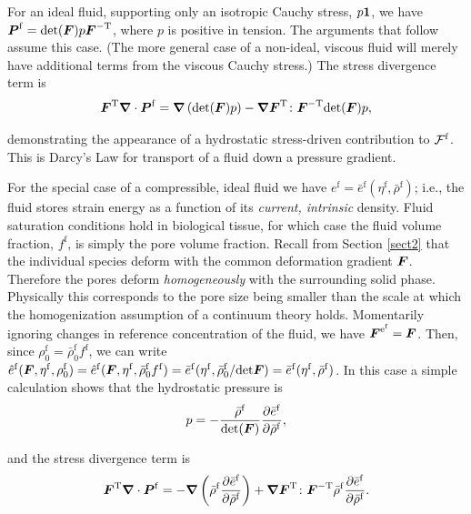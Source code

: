 \noindent For an ideal fluid, supporting only an isotropic Cauchy
stress, $p{\bf 1}$, we have $\mbox{\boldmath$ P$}^\mathrm{f} =
\mathrm{det}(\mbox{\boldmath$ F$})p\mbox{\boldmath$ F$}^{-\mathrm{T}}$, where $p$ is positive in
tension. The arguments that follow assume this case. (The more
general case of a non-ideal, viscous fluid will merely have
additional terms from the viscous Cauchy stress.) The stress
divergence term is
\begin{equation}
\mbox{\boldmath$ F$}^\mathrm{T}\mbox{\boldmath$\nabla$}\cdot\mbox{\boldmath$ P$}^\mathrm{f} =
\mbox{\boldmath$\nabla$}\left(\mathrm{det}(\mbox{\boldmath$ F$})p\right) -
\mbox{\boldmath$\nabla$}\mbox{\boldmath$ F$}^\mathrm{T}\colon\mbox{\boldmath$ F$}^{-\mathrm{T}}\mathrm{det}(\mbox{\boldmath$ F$})p,
\end{equation}

\noindent demonstrating the appearance of a hydrostatic
stress-driven contribution to ${\boldmath{{\mathcal F}}}^\mathrm{f}$. This
is Darcy's Law for transport of a fluid down a pressure gradient.

For the special case of a compressible, ideal fluid we have
$e^\mathrm{f} =
\bar{e}^\mathrm{f}(\eta^\mathrm{f},\bar{\rho}^\mathrm{f})$; i.e.,
the fluid stores strain energy as a function of its \emph{current,
intrinsic} density. Fluid saturation conditions hold in biological
tissue, for which case the fluid volume fraction, $f^\mathrm{f}$,
is simply the pore volume fraction. Recall from Section
\ref{sect2} that the individual species deform with the common
deformation gradient $\mbox{\boldmath$ F$}$. Therefore the pores deform
\emph{homogeneously} with the surrounding solid phase. Physically
this corresponds to the pore size being smaller than the scale at
which the homogenization assumption of a continuum theory holds.
Momentarily ignoring changes in reference concentration of the
fluid, we have $\mbox{\boldmath$ F$}^{\mathrm{e}^\mathrm{f}} = \mbox{\boldmath$ F$}$.  Then, since
$\rho^\mathrm{f}_0 = \bar{\rho}^\mathrm{f}_0 f^\mathrm{f}$, we can
write $\hat{e}^\mathrm{f}(\mbox{\boldmath$ F$},\eta^\mathrm{f},\rho^\mathrm{f}_0) =
\hat{e}^\mathrm{f}(\mbox{\boldmath$ F$},\eta^\mathrm{f},\bar{\rho}^\mathrm{f}_0
f^\mathrm{f}) =
\bar{e}^\mathrm{f}(\eta^\mathrm{f},\bar{\rho}^\mathrm{f}_0/\mathrm{det}\mbox{\boldmath$ F$})=
\bar{e}^\mathrm{f}(\eta^\mathrm{f},\bar{\rho}^\mathrm{f})$. In
this case a simple calculation shows that the hydrostatic pressure
is
\begin{displaymath}
p =
-\frac{\bar{\rho}^\mathrm{f}}{\mathrm{det}(\mbox{\boldmath$ F$})}\frac{\partial\bar{e}^\mathrm{f}}{\partial\bar{\rho}^\mathrm{f}},
\end{displaymath}

\noindent and the stress divergence term is
\begin{displaymath}
\mbox{\boldmath$ F$}^\mathrm{T}\mbox{\boldmath$\nabla$}\cdot\mbox{\boldmath$ P$}^\mathrm{f} =
-\mbox{\boldmath$\nabla$}\left(\bar{\rho}^\mathrm{f}\frac{\partial\bar{e}^\mathrm{f}}{\partial\bar{\rho}^\mathrm{f}}\right)
+
\mbox{\boldmath$\nabla$}\mbox{\boldmath$ F$}^\mathrm{T}\colon\mbox{\boldmath$ F$}^{-\mathrm{T}}\bar{\rho}^\mathrm{f}\frac{\partial\bar{e}^\mathrm{f}}{\partial\bar{\rho}^\mathrm{f}}.
\end{displaymath}

